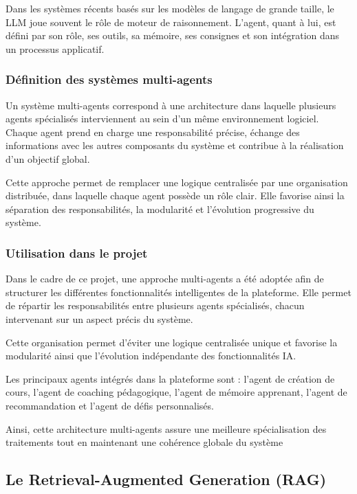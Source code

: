 Dans les systèmes récents basés sur les modèles de langage de grande taille, le LLM joue
souvent le rôle de moteur de raisonnement. L'agent, quant à lui, est défini par son rôle, ses
outils, sa mémoire, ses consignes et son intégration dans un processus applicatif.

\subsubsection{Définition des systèmes multi-agents}

Un système multi-agents \cite{google_multi_agent_system} correspond à une architecture dans
laquelle plusieurs agents spécialisés interviennent au sein d'un même environnement logiciel.
Chaque agent prend en charge une responsabilité précise, échange des informations avec les
autres composants du système et contribue à la réalisation d'un objectif global.

Cette approche permet de remplacer une logique centralisée par une organisation distribuée,
dans laquelle chaque agent possède un rôle clair. Elle favorise ainsi la séparation des
responsabilités, la modularité et l'évolution progressive du système.

\subsubsection{Utilisation dans le projet}

Dans le cadre de ce projet, une approche multi-agents a été adoptée afin de structurer les différentes fonctionnalités intelligentes de la plateforme. Elle permet de répartir les responsabilités entre plusieurs agents spécialisés, chacun intervenant sur un aspect précis du système.

Cette organisation permet d'éviter une logique centralisée unique et favorise la modularité ainsi que l'évolution indépendante des fonctionnalités IA.

Les principaux agents intégrés dans la plateforme sont : l'agent de création de cours, l'agent de coaching pédagogique, l'agent de mémoire apprenant, l'agent de recommandation et l'agent de défis personnalisés.

Ainsi, cette architecture multi-agents assure une meilleure spécialisation des traitements tout en maintenant une cohérence globale du système

\subsection{Le Retrieval-Augmented Generation (RAG)}


